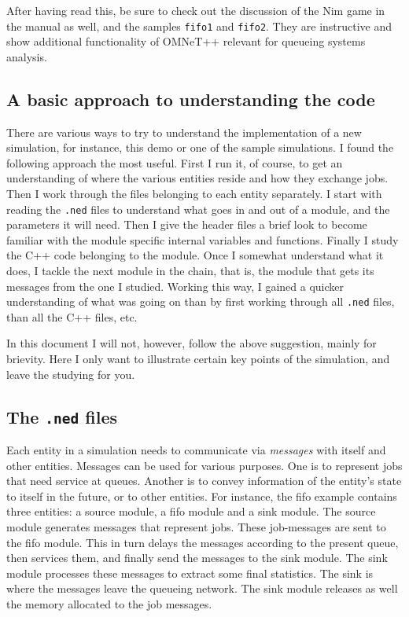 \documentclass[a4paper]{article}
\begin{document}
After having read this, be sure to check out the discussion of the Nim
game in the manual as well, and the samples \texttt{fifo1} and
\texttt{fifo2}.  They are instructive and show additional
functionality of OMNeT++ relevant for queueing systems analysis.

\subsection{A basic  approach to understanding the code}
There are various ways to try to understand the implementation of a
new simulation, for instance, this demo or one of the sample
simulations. I found the following approach the most useful. First I
run it, of course, to get an understanding of where the various
entities reside and how they exchange jobs. Then I work through the
files belonging to  each
entity  separately. I start with reading the \texttt{.ned} files to
understand what goes in and out of a module, and the parameters it
will need.  Then I give the header files a brief look to become
familiar with the module specific internal variables and functions.
Finally I study the C++ code belonging to the  module. Once I somewhat
understand what it  does, I tackle the next module in the
chain, that is, the module that gets its messages from the one  I
studied. Working this way, I gained a quicker understanding
of what was going on than by first working through all \texttt{.ned}
files, than all the C++ files, etc.

In this document I will not, however, follow the above suggestion,
mainly for brievity. Here I only want to illustrate certain key points
of the simulation, and leave the studying for you.

\subsection{The \texttt{.ned} files}
\label{sec:texttt.ned-files}
Each entity in a simulation needs to communicate via \emph{messages}
with itself and other entities. Messages can be used for various
purposes. One is to represent jobs that need service at queues.
Another is to convey information of the entity's state to itself in
the future, or to other entities. For instance, the fifo example
contains three entities: a source module, a fifo module and a sink
module. The source module generates messages that represent jobs.
These job-messages are sent to the fifo module. This in turn delays
the messages according to the present queue, then services them, and
finally send the messages to the sink module. The sink module
processes these messages to extract some final statistics. The sink is
where the messages leave the queueing network.  The sink module
releases as well the memory allocated to the job messages.
\end{document}
